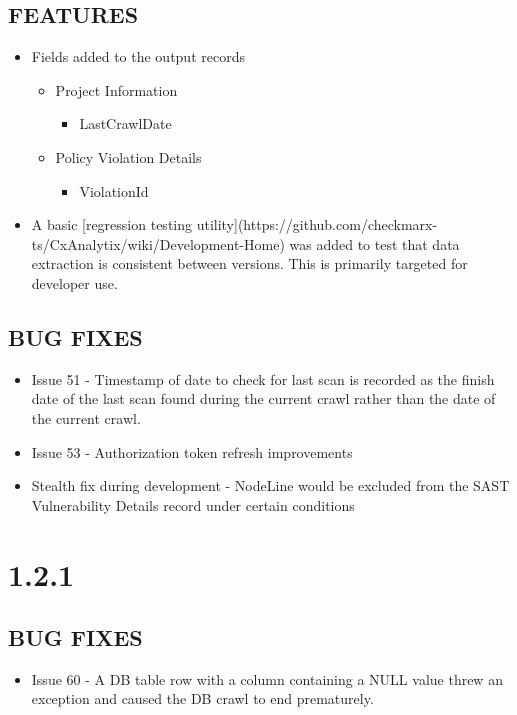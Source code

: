 \subsection*{FEATURES}
    \begin{itemize}
        \item Fields added to the output records
        \begin{itemize}
            \item Project Information
            \begin{itemize}
                \item LastCrawlDate
            \end{itemize}
        \end{itemize}
        \begin{itemize}
            \item Policy Violation Details
            \begin{itemize}
                \item ViolationId
            \end{itemize}
        \end{itemize}
        \item A basic [regression testing utility](https://github.com/checkmarx-ts/CxAnalytix/wiki/Development-Home) was added to test that data extraction is consistent between versions.  This is primarily targeted for developer use.
    \end{itemize}

\subsection*{BUG FIXES}
    \begin{itemize}
        \item Issue 51 - Timestamp of date to check for last scan is recorded as the finish date of the last scan found during the current crawl rather than the date of the current crawl.
        \item Issue 53 - Authorization token refresh improvements
        \item Stealth fix during development - NodeLine would be excluded from the SAST Vulnerability Details record under certain conditions 
    \end{itemize}


\section{1.2.1}
\subsection*{BUG FIXES}
    \begin{itemize}
        \item Issue 60 - A DB table row with a column containing a NULL value threw an exception and caused the DB crawl to end prematurely.
    \end{itemize}


